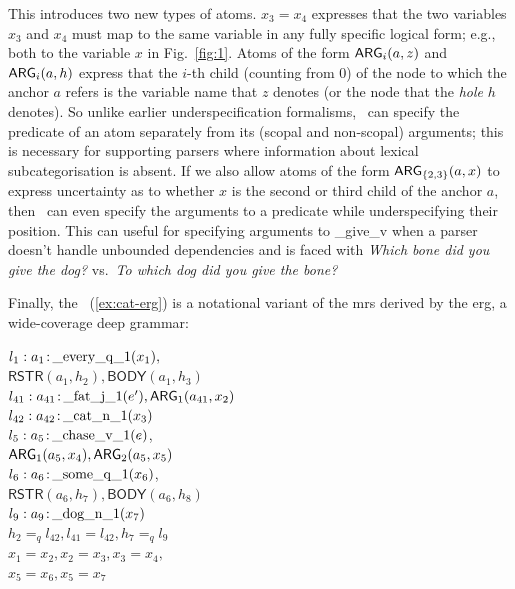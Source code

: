 This introduces two new types of atoms.   $x_3=x_4$
expresses that the two variables $x_3$ and $x_4$ must map to the same
variable in any fully specific logical form; e.g., both to the
variable $x$ in Fig.~\ref{fig:1}.  Atoms of the form $\mathsf{ARG}_i(a,z)$ and
$\mathsf{ARG}_i(a,h)$ express that the $i$-th child (counting from 0) of the
node to which the anchor $a$ refers is the variable name that $z$
denotes (or the node that the {\em hole} $h$ denotes).  So unlike
earlier underspecification formalisms, \rmrs\ can specify the
predicate of an atom separately from its (scopal and non-scopal)
arguments; this is necessary for supporting parsers where information
about lexical subcategorisation is absent. If we also allow atoms of
the form $\mathsf{ARG}_{\{2,3\}}(a,x)$ to express uncertainty as to whether
$x$ is the second or third child of the anchor $a$, then \rmrs\ can
even specify the arguments to a predicate while underspecifying their
position.  This can useful for specifying arguments to \_give\_v when a
parser doesn't handle unbounded dependencies and is faced with
{\em Which bone did you give the dog?} vs.\ {\em To which dog did you
  give the bone?}

Finally, the \rmrs\ (\ref{ex:cat-erg}) is a notational variant of the
{\sc mrs} derived by the {\sc erg}, a wide-coverage deep grammar:
\begin{examples}
\item $l_1:a_1\colon\!\mathrm{\_every\_q\_1}(x_1),$\\
\hspace*{0.1in}$\mathsf{RSTR}(a_1,h_2),
\mathsf{BODY}(a_1,h_3)$\\ 
$l_{41}:a_{41}\colon\!\mathrm{\_fat\_j\_1}(e'), \mathsf{ARG}_1(a_{41},x_2)$\\
$l_{42}:a_{42}\colon\!\mathrm{\_cat\_n\_1}(x_3)$\\
$l_5:a_5\colon\!\mathrm{\_chase\_v\_1}(e)$,\\
\hspace*{0.1in}$\mathsf{ARG}_1(a_5,x_4),
\mathsf{ARG}_2(a_5,x_5)$\\ 
$l_6:a_6\colon\!\mathrm{\_some\_q\_1}(x_6)$,\\
\hspace*{0.1in}$\mathsf{RSTR}(a_6,h_7),
\mathsf{BODY}(a_6,h_8)$\\ 
$l_9:a_9\colon\!\mathrm{\_dog\_n\_1}(x_7)$\\
$h_2=_q l_{42}, l_{41}=l_{42}, h_7 =_q l_9$\\
$x_1=x_2, x_2=x_3, x_3=x_4,$\\
$x_5=x_6, x_5=x_7$
\label{ex:cat-erg}
\end{examples}

